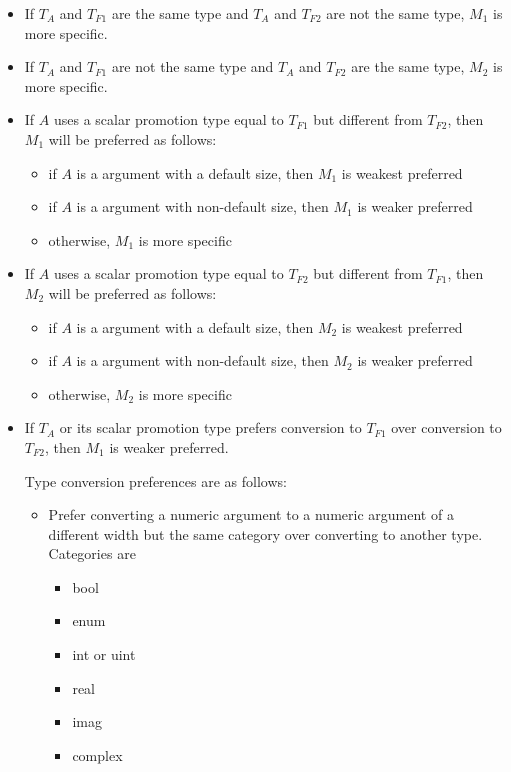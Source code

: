\begin{itemize}
\item
 If $T_A$ and $T_{F1}$ are the same type and $T_A$ and $T_{F2}$ are
 not the same type, $M_1$ is more specific.
\item
 If $T_A$ and $T_{F1}$ are not the same type and $T_A$ and $T_{F2}$
 are the same type, $M_2$ is more specific.

\item
If $A$ uses a scalar promotion type equal to $T_{F1}$ but different
from $T_{F2}$, then $M_1$ will be preferred as follows:

\begin{itemize}
  \item if $A$ is a  argument with a default size, then $M_1$
    is weakest preferred
  \item if $A$ is a  argument with non-default size, then $M_1$
    is weaker preferred
  \item otherwise, $M_1$ is more specific
\end{itemize}

\item
If $A$ uses a scalar promotion type equal to $T_{F2}$ but different
from $T_{F1}$, then $M_2$ will be preferred as follows:

\begin{itemize}
  \item if $A$ is a  argument with a default size, then $M_2$
    is weakest preferred
  \item if $A$ is a  argument with non-default size, then $M_2$
    is weaker preferred
  \item otherwise, $M_2$ is more specific
\end{itemize}

\item
If $T_A$ or its scalar promotion type prefers conversion to $T_{F1}$
over conversion to $T_{F2}$, then $M_1$ is weaker preferred.

Type conversion preferences are as follows:
\begin{itemize}
  \item
    Prefer converting a numeric argument to a numeric argument of
    a different width but the same category
    over converting to another type. Categories are
    \begin{itemize}
      \item
        bool
      \item
        enum
      \item
        int or uint
      \item
        real
      \item
        imag
      \item
        complex
    \end{itemize}


\end{itemize}
\end{itemize}
